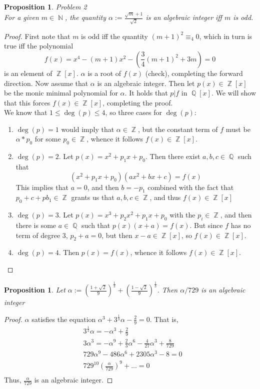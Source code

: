 \documentclass{article}
\newtheorem{proposition}[theorem]{Proposition}
\DeclareMathOperator{\Z}{\mathbb{Z}}
\DeclareMathOperator{\Q}{\mathbb{Q}}
\DeclareMathOperator{\N}{\mathbb{N}}
\begin{document}
\begin{proposition}{Problem 2}\\
For a given $m\in\N$, the quantity $\alpha:= \frac{\sqrt{m}+1}{\sqrt{2}}$ is an algebraic integer iff $m$ is odd.
\end{proposition}
\begin{proof}
First note that $m$ is odd iff the quantity $(m+1)^2\equiv_{4}0$, which in turn is true iff the polynomial
\begin{equation*}
f(x) = x^4 - (m+1)x^2 - (\frac{3}{4}(m+1)^2 + 3m) = 0
\end{equation*}
is an element of $\Z[x]$.   $\alpha$ is a root of $f(x)$ (check), completing the forward direction.  Now assume that $\alpha$ is an algebraic integer.  Then let $p(x)\in\Z[x]$ be the monic minimal polynomial for $\alpha$.  It holds that $p|f$ in $\Q[x]$.  We will show that this forces $f(x)\in\Z[x]$, completing the proof.\\We know that $1\leq\deg(p)\leq4$, so three cases for $\deg(p)$:
\begin{enumerate}
	\item $\deg(p)=1$ would imply that $\alpha\in\Z$, but the constant term of $f$ must be $\alpha*p_0$ for some $p_0\in\Z$, whence it follows $f(x)\in\Z[x]$.
	\item $\deg(p)=2$.  Let $p(x)=x^2+p_1x+p_0$.  Then there exist $a,b,c\in\Q$ such that
	\begin{equation*}
	(x^2+p_1x+p_0)(ax^2+bx+c) = f(x)
	\end{equation*}
	This implies that $a=0$, and then $b=-p_1$ combined with the fact that $p_0+c+pb_1\in\Z$ grants us that $a,b,c\in\Z$, and thus $f(x)\in\Z[x]$
	\item $\deg(p)=3$.  Let $p(x) = x^3+p_2x^2+p_1x+p_0$ with the $p_i\in\Z$, and then there is some $a\in\Q$ such that $p(x)(x+a)=f(x)$.  But since $f$ has no term of degree $3$, $p_2+a=0$, but then $x-a\in\Z[x]$, so $f(x)\in\Z[x]$. 
	\item $\deg(p)=4$.  Then $p(x)=f(x)$, whence it follows $f(x)\in\Z[x]$.
\end{enumerate}
\end{proof}
\begin{proposition}
	Let $\alpha := (\frac{1+\sqrt{2}}{9})^\frac{1}{3} + (\frac{1-\sqrt{2}}{9})^\frac{1}{3}$.  Then $\alpha/729$ is an algebraic integer
\end{proposition}
\begin{proof}
	$\alpha$ satisfies the equation $\alpha^3+3^\frac{1}{3}\alpha-\frac{2}{9} = 0$.  That is,
	\begin{align*}
	&3^{\frac{1}{3}}\alpha = -\alpha^3 + \frac{2}{9}\\
	&3\alpha^3 = -\alpha^9+\frac{2}{3}\alpha^6-\frac{4}{27}\alpha^3+\frac{8}{729}\\
	&729\alpha^9-486\alpha^6+2305\alpha^3-8=0\\
	&729^{10}(\frac{\alpha}{729})^9 + ... = 0\\
	\end{align*}
	Thus, $\frac{\alpha}{729}$ is an algebraic integer.
\end{proof}
\end{document}
